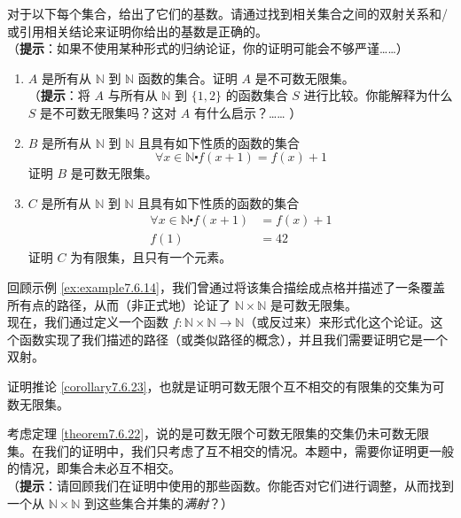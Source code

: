 \begin{exercise}
    对于以下每个集合，给出了它们的基数。请通过找到相关集合之间的双射关系和/或引用相关结论来证明你给出的基数是正确的。\\
    （\textbf{提示}：如果不使用某种形式的归纳论证，你的证明可能会不够严谨……）
    \begin{enumerate}[label=(\alph*)]
        \item $A$ 是所有从 $\mathbb{N}$ 到 $\mathbb{N}$ 函数的集合。证明 $A$ 是不可数无限集。\\
              （\textbf{提示}：将 $A$ 与所有从 $\mathbb{N}$ 到 $\{1, 2\}$ 的函数集合 $S$ 进行比较。你能解释为什么 $S$ 是不可数无限集吗？这对 $A$ 有什么启示？…… ）
        \item $B$ 是所有从 $\mathbb{N}$ 到 $\mathbb{N}$ 且具有如下性质的函数的集合
              \[\forall x \in \mathbb{N} \centerdot f(x + 1) = f(x) + 1 \]
              证明 $B$ 是可数无限集。
        \item $C$ 是所有从 $\mathbb{N}$ 到 $\mathbb{N}$ 且具有如下性质的函数的集合
              \begin{align*}
                  \forall x \in \mathbb{N} \centerdot f(x + 1) & = f(x) + 1 \\
                  f(1)                                         & = 42
              \end{align*}
              证明 $C$ 为有限集，且只有一个元素。
    \end{enumerate}
\end{exercise}

\begin{exercise}
    回顾示例 \ref{ex:example7.6.14}，我们曾通过将该集合描绘成点格并描述了一条覆盖所有点的路径，从而（非正式地）论证了 $\mathbb{N} \times \mathbb{N}$ 是可数无限集。\\
    现在，我们通过定义一个函数 $f : \mathbb{N} \times \mathbb{N} \to \mathbb{N}$（或反过来）来形式化这个论证。这个函数实现了我们描述的路径（或类似路径的概念），并且我们需要证明它是一个双射。
\end{exercise}

\begin{exercise}
    证明推论 \ref{corollary7.6.23}，也就是证明可数无限个互不相交的有限集的交集为可数无限集。\label{exc:exercises7.8.36}
\end{exercise}

\begin{exercise}
    考虑定理 \ref{theorem7.6.22}，说的是可数无限个可数无限集的交集仍未可数无限集。在我们的证明中，我们只考虑了互不相交的情况。本题中，需要你证明更一般的情况，即集合未必互不相交。\\
    （\textbf{提示}：请回顾我们在证明中使用的那些函数。你能否对它们进行调整，从而找到一个从 $\mathbb{N} \times \mathbb{N}$ 到这些集合并集的\emph{满射}？）\label{exc:exercises7.8.37}
\end{exercise}

